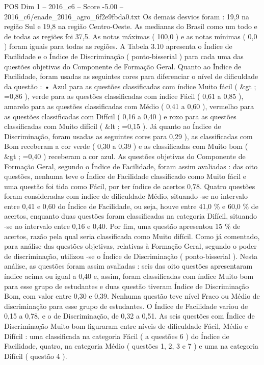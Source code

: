 \begin{textsample}{POS Dim 1 – 2016\_c6 – Score -5.00 – 2016\_c6/enade\_2016\_agro\_6f2e9fbda0.txt}
Os demais desvios foram : 19,9 na região Sul e 19,8 na região Centro-Oeste.
As medianas do Brasil como um todo e de todas as regiões foi 37,5.
As notas máximas ( 100,0 ) e as notas mínimas ( 0,0 ) foram iguais para todas as regiões.
A Tabela 3.10 apresenta o Índice de Facilidade e o Índice de Discriminação ( ponto-bisserial ) para cada uma das questões objetivas do Componente de Formação Geral.
Quanto ao Índice de Facilidade, foram usadas as seguintes cores para diferenciar o nível de dificuldade da questão : • Azul para as questões classificadas com índice Muito fácil ( \&gt ; =0,86 ), verde para as questões classificadas com índice Fácil ( 0,61 a 0,85 ), amarelo para as questões classificadas com Médio ( 0,41 a 0,60 ), vermelho para as questões classificadas com Difícil ( 0,16 a 0,40 ) e roxo para as questões classificadas com Muito difícil ( \&lt ; =0,15 ).
Já quanto ao Índice de Discriminação, foram usadas as seguintes cores para 0,29 ), as classificadas com Bom receberam a cor verde ( 0,30 a 0,39 ) e as classificadas com Muito bom ( \&gt ; =0,40 ) receberam a cor azul.
As questões objetivas do Componente de Formação Geral, segundo o Índice de Facilidade, foram assim avaliadas : das oito questões, nenhuma teve o Índice de Facilidade classificado como Muito fácil e uma questão foi tida como Fácil, por ter índice de acertos 0,78.
Quatro questões foram consideradas com índice de dificuldade Médio, situando -se no intervalo entre 0,41 e 0,60 do Índice de Facilidade, ou seja, houve entre 41,0 \% e 60,0 \% de acertos, enquanto duas questões foram classificadas na categoria Difícil, situando -se no intervalo entre 0,16 e 0,40.
Por fim, uma questão apresentou 15 \% de acertos, razão pela qual seria classificada como Muito difícil.
Como já comentado, para análise das questões objetivas, relativas à Formação Geral, segundo o poder de discriminação, utilizou -se o Índice de Discriminação ( ponto-bisserial ).
Nesta análise, as questões foram assim avaliadas : seis das oito questões apresentaram índice acima ou igual a 0,40 e, assim, foram classificadas com índice Muito bom para esse grupo de estudantes e duas questão tiveram Índice de Discriminação Bom, com valor entre 0,30 e 0,39.
Nenhuma questão teve nível Fraco ou Médio de discriminação para esse grupo de estudantes.
O Índice de Facilidade variou de 0,15 a 0,78, e o de Discriminação, de 0,32 a 0,51.
As seis questões com Índice de Discriminação Muito bom figuraram entre níveis de dificuldade Fácil, Médio e Difícil : uma classificada na categoria Fácil ( a questões 6 ) do Índice de Facilidade, quatro, na categoria Médio ( questões 1, 2, 3 e 7 ) e uma na categoria Difícil ( questão 4 ).

\end{textsample}
